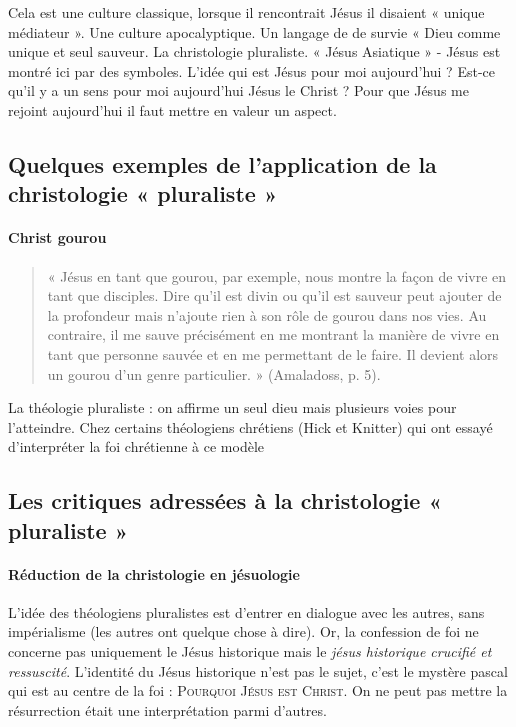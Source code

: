 	Cela est une culture classique, lorsque il rencontrait Jésus il disaient « unique médiateur ». Une culture apocalyptique. Un langage de de survie «  Dieu comme unique et seul sauveur. 
	La christologie pluraliste. « Jésus Asiatique » - Jésus est montré ici par des symboles. L’idée qui est Jésus pour moi aujourd'hui ? Est-ce qu’il y a un sens pour moi aujourd'hui Jésus le Christ ? Pour que Jésus me rejoint aujourd'hui il faut mettre en valeur un aspect. 

\subsection{Quelques exemples de l’application de la christologie « pluraliste »} 

\paragraph{Christ gourou}
\begin{quote}
    « Jésus en tant que gourou, par exemple, nous montre la façon de vivre en tant que disciples. Dire qu'il est divin ou qu'il est sauveur peut ajouter de la profondeur mais n'ajoute rien à son rôle de gourou dans nos vies. Au contraire, il me sauve précisément en me montrant la manière de vivre en tant que personne sauvée et en me permettant de le faire. Il devient alors un gourou d'un genre particulier. » (Amaladoss, p. 5). 
\end{quote}

\begin{Synthesis}
La théologie pluraliste : on affirme un seul dieu mais plusieurs voies pour l'atteindre. Chez certains théologiens chrétiens (Hick et Knitter) qui ont essayé d'interpréter la foi chrétienne à ce modèle
\end{Synthesis}

\subsection{Les critiques adressées à la christologie « pluraliste » }

\paragraph{Réduction de la christologie en jésuologie}  L'idée des théologiens pluralistes est d'entrer en dialogue avec les autres, sans impérialisme (les autres ont quelque chose à dire). Or, la confession de foi ne concerne pas uniquement le Jésus historique mais le \textit{jésus historique crucifié et ressuscité}. L'identité du Jésus historique n'est pas le sujet, c'est le mystère pascal qui est au centre de la foi : \textsc{Pourquoi Jésus est Christ}. On ne peut pas mettre la résurrection était une interprétation parmi d'autres. 

